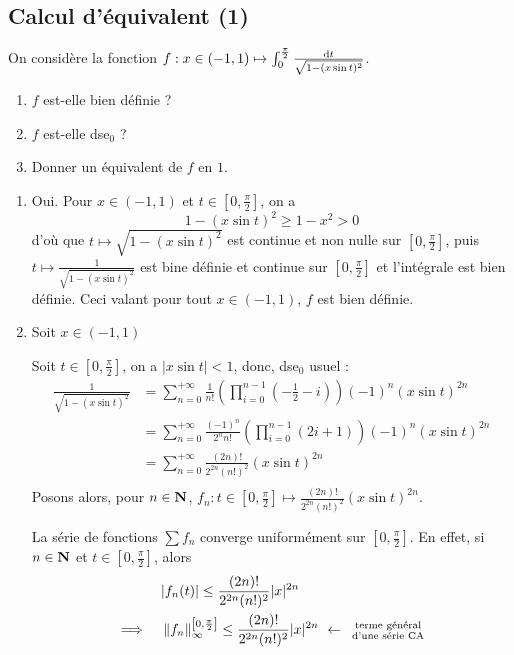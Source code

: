 \subsection{Calcul d'équivalent (1)}
\begin{exercice}
	On considère la fonction $f:x\in(-1,1)\mapsto \int_0^{\frac\pi2}\frac{\mathrm{d} t}{\sqrt{1-(x\sin t)^2}}$.
	\begin{enumerate}
		\item $f$ est-elle bien définie ?
		\item $f$ est-elle dse${}_0$ ?
		\item Donner un équivalent de $f$ en $1$.
	\end{enumerate}
\end{exercice}


\begin{correction}
	\begin{enumerate}
		\item Oui. Pour $x\in(-1,1)$ et $t\in\left[0,\frac\pi2\right]$, on a \[1-(x\sin t)^2\geq 1-x^2> 0\]
		d'où que $t\mapsto \sqrt{1-(x\sin t)^2}$ est continue et non nulle sur $\left[0,\frac\pi2\right]$, puis $t\mapsto \frac1{\sqrt{1-(x\sin t)^2}}$ est bine définie et continue sur $\left[0,\frac\pi2\right]$ et l'intégrale est bien définie. Ceci valant pour tout $x\in(-1,1)$, $f$ est bien définie.
		\item Soit $x\in(-1,1)$


		Soit $t\in\left[0,\frac\pi2\right]$, on a $|x\sin t| < 1$, donc, dse${}_0$ usuel : 
		\begin{align*}
			\frac1{\sqrt{1-(x\sin t)^2}} &= \sum_{n=0}^{+\infty}\frac1{n!}\left(\prod_{i=0}^{n-1}\left(-\frac12-i\right)\right)(-1)^n(x\sin t)^{2n}\\
										 &= \sum_{n=0}^{+\infty}\frac{(-1)^n}{2^nn!}\left(\prod_{i=0}^{n-1}(2i+1)\right)(-1)^n(x\sin t)^{2n}\\
										 &= \sum_{n=0}^{+\infty}\frac{(2n)!}{2^{2n}(n!)^2}(x\sin t)^{2n}\\
		\end{align*}
		Posons alors, pour $n\in\operatorname{\mathbf{N}}$, $f_n:t\in\left[0,\frac\pi2\right]\mapsto\frac{(2n)!}{2^{2n}(n!)^2}(x\sin t)^{2n}$.


		La série de fonctions $\displaystyle\sum f_n$ converge uniformément sur $\left[0,\frac\pi2\right]$. En effet, si $n\in\operatorname{\mathbf{N}}$ et $t\in\left[0,\frac\pi2\right]$, alors 
		\begin{align*}
			& \quad |f_n(t)|\leq \frac{(2n)!}{2^{2n}(n!)^2}|x|^{2n}\\
			\implies & \quad  \norm{f_n}_\infty^{\left[0,\frac\pi2\right]} \leq \frac{(2n)!}{2^{2n}(n!)^2}|x|^{2n} \ \leftarrow \ \begin{smallmatrix}\text{terme général}\\ \text{d'une série CA}\end{smallmatrix}
		\end{align*}


\end{enumerate}
\end{correction}
